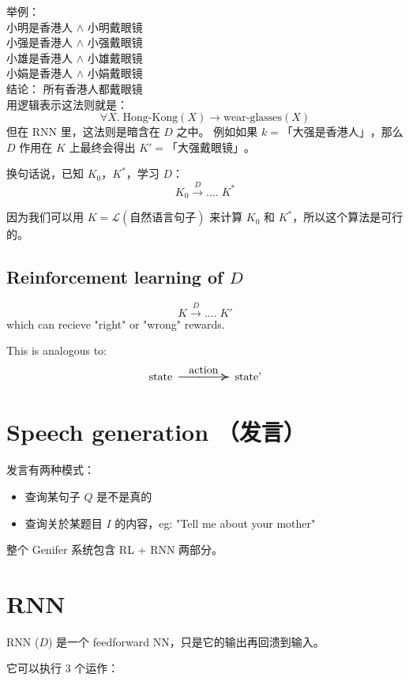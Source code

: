 \documentclass[12pt]{article}
\newcommand{\tab}{\hspace*{1cm}}
\begin{document}
举例：\\
\tab 小明是香港人 $\wedge$ 小明戴眼镜 \\
\tab 小强是香港人 $\wedge$ 小强戴眼镜 \\
\tab 小雄是香港人 $\wedge$ 小雄戴眼镜 \\
\tab 小娟是香港人 $\wedge$ 小娟戴眼镜 \\
\tab 结论： 所有香港人都戴眼镜 \\
用逻辑表示这法则就是：
$$ \forall X. \; \mbox{Hong-Kong}(X) \rightarrow \mbox{wear-glasses}(X) $$
但在 RNN 里，这法则是暗含在 $D$ 之中。 例如如果 $k = \mbox{「大强是香港人」}$，那么 $D$ 作用在 $K$ 上最终会得出 $K' = \mbox{「大强戴眼镜」}$。

换句话说，已知 $K_0$，$K^*$，学习 $D$：
$$ K_0 \stackrel{D}{\longrightarrow} .... \; K^* $$

因为我们可以用 $K = \mathcal{L}(\mbox{自然语言句子})$ 来计算 $K_0$ 和 $K^*$，所以这个算法是可行的。

\subsection{Reinforcement learning of \texorpdfstring{$D$}{D}}

$$ K \stackrel{D}{\longrightarrow} .... \; K' $$
which can recieve "right" or "wrong" rewards.

This is analogous to:
$$ \mbox{state} \stackrel{\mbox{action}}{\resizebox{1.8cm}{0.15cm}{$\longrightarrow$}} \mbox{state'}$$


\section{Speech generation （发言）}

发言有两种模式：
\begin{itemize}
\item 查询某句子 $Q$ 是不是真的
\item 查询关於某题目 $I$ 的内容，eg: "Tell me about your mother"
\end{itemize}

整个 Genifer 系统包含 RL + RNN 两部分。

\section{RNN}

RNN ($D$) 是一个 feedforward NN，只是它的输出再回溃到输入。


它可以执行 3 个运作：
\end{document}
